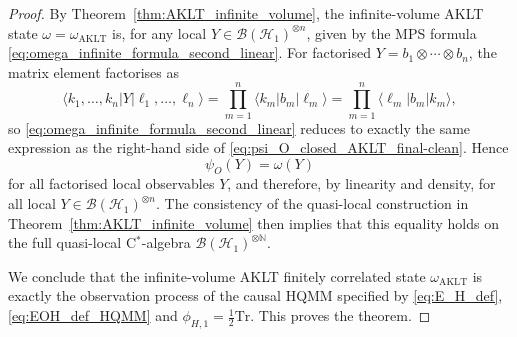 \documentclass[10pt,a4paper]{amsart}
\def\Tr{\mathrm{Tr}}
\begin{document}
\begin{proof}
By Theorem~\ref{thm:AKLT_infinite_volume}, the infinite-volume AKLT state $\omega=\omega_{\mathrm{AKLT}}$ is, for any local $Y\in\mathcal{B}(\mathcal{H}_{1})^{\otimes n}$, given by the MPS formula \eqref{eq:omega_infinite_formula_second_linear}. For factorised $Y=b_1\otimes\cdots\otimes b_n$, the matrix element factorises as
\[
\langle k_1,\dots,k_n|Y|\ell_1,\dots,\ell_n\rangle
=
\prod_{m=1}^n \langle k_m|b_m|\ell_m\rangle
=
\prod_{m=1}^n \langle \ell_m|b_m|k_m\rangle,
\]
so \eqref{eq:omega_infinite_formula_second_linear} reduces to exactly the same expression as the right-hand side of \eqref{eq:psi_O_closed_AKLT_final-clean}. Hence
\[
\psi_{O}(Y)=\omega(Y)
\]
for all factorised local observables $Y$, and therefore, by linearity and density, for all local $Y\in\mathcal{B}(\mathcal{H}_{1})^{\otimes n}$. The consistency of the quasi-local construction in Theorem~\ref{thm:AKLT_infinite_volume} then implies that this equality holds on the full quasi-local C\(^*\)-algebra $\mathcal{B}(\mathcal{H}_{1})^{\otimes\mathbb{N}}$.

We conclude that the infinite-volume AKLT finitely correlated state $\omega_{\mathrm{AKLT}}$ is exactly the observation process of the causal HQMM specified by \eqref{eq:E_H_def}, \eqref{eq:EOH_def_HQMM} and $\phi_{H,1}=\tfrac{1}{2}\Tr$. This proves the theorem.
\end{proof}
\end{document}
